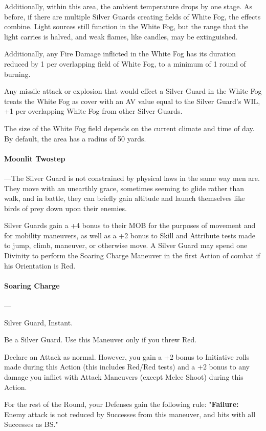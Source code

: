 \documentclass[oneside,11pt,english]{book}
\begin{document}
Additionally, within this area, the ambient temperature drops by 
one stage. As before, if there are multiple Silver Guards creating fields of White Fog, the effects 
combine. Light sources still function in the White Fog, but the range that the light carries is  halved, and weak flames, like candles, may be extinguished. 

Additionally, any Fire Damage inflicted in the White Fog has its duration reduced by 1 per 
overlapping field of White Fog, to a minimum of 1 round of burning. 

Any missile attack or explosion that would effect a Silver Guard in the White Fog treats the White Fog as cover with an AV value equal to the Silver Guard's WIL, +1 per overlapping White Fog from other Silver Guards. 


The size of the White Fog field depends on the current climate and time of day. By default, the area has a radius of 50 yards.
\paragraph{Moonlit Twostep}
---\quad The Silver Guard is not constrained by physical laws in the same way men are. They move with 
an unearthly grace, sometimes seeming to glide rather than walk, and in battle, they can briefly 
gain altitude and launch themselves like birds of prey down upon their enemies. 


Silver Guards gain a +4 bonus to their MOB for the purposes of movement and for mobility 
maneuvers, as well as a +2 bonus to Skill and Attribute tests made to jump, climb, maneuver, or 
otherwise move. A Silver Guard may spend one Divinity to perform the Soaring Charge 
Maneuver in the first Action of combat if his Orientation is Red. 


\paragraph{\label{man:Soaring Charge}Soaring Charge}---
\begin{description}
	[itemsep=0.5mm]
\item [Special:] Silver Guard, Instant. 
\item [Requirements:] Be a Silver Guard. Use this Maneuver only if you threw Red. 
\item [Maneuver:] Declare an Attack as normal. However, you gain a +2 bonus to Initiative rolls made during this Action (this includes Red/Red tests) and a +2 bonus to any damage you inflict with Attack Maneuvers (except Melee Shoot) during this Action.
\item [Special:] For the rest of the Round, your Defenses gain the following rule: "\textbf{Failure:} Enemy attack is not reduced by Successes from this maneuver, and hits with all Successes as BS."
\end{description}
\end{document}
